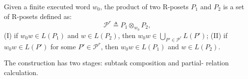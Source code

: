 \begin{definition}
\label{ch04:def:product_of_r_posets}
Given a finite executed word $w_0$, the product of two R-posets
$P_1$ and $P_2$ is a set of R-posets defined as:
\begin{equation}
\label{ch04:eq:product_of_r_posets}
\mathcal{P}^{r} \triangleq P_1 \otimes_{w_0} P_2,
\end{equation}
(I) if $w_0w \in L(P_1)$ and $w \in L(P_2)$, then
$w_0w \in \bigcup_{P' \in \mathcal{P}^{r}} L(P')$;
(II) if $w_0w \in L(P')$ for some $P' \in \mathcal{P}^{r}$, then
$w_0w \in L(P_1)$ and $w \in L(P_2)$.
\end{definition}

 The construction has two stages: subtask composition and partial-
relation calculation.


